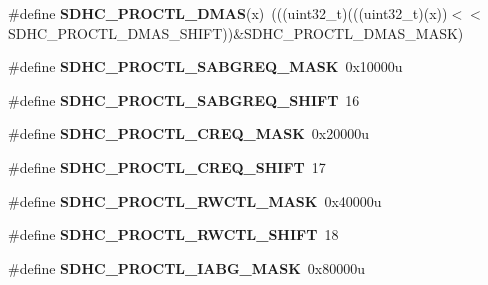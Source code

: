 \begin{DoxyCompactItemize}
\item 
\#define {\bfseries S\+D\+H\+C\+\_\+\+P\+R\+O\+C\+T\+L\+\_\+\+D\+M\+AS}(x)~(((uint32\+\_\+t)(((uint32\+\_\+t)(x))$<$$<$S\+D\+H\+C\+\_\+\+P\+R\+O\+C\+T\+L\+\_\+\+D\+M\+A\+S\+\_\+\+S\+H\+I\+FT))\&S\+D\+H\+C\+\_\+\+P\+R\+O\+C\+T\+L\+\_\+\+D\+M\+A\+S\+\_\+\+M\+A\+SK)\hypertarget{group__SDHC__Register__Masks_gab38de53d7a54fdbd16e4a485b83282af}{}\label{group__SDHC__Register__Masks_gab38de53d7a54fdbd16e4a485b83282af}

\item 
\#define {\bfseries S\+D\+H\+C\+\_\+\+P\+R\+O\+C\+T\+L\+\_\+\+S\+A\+B\+G\+R\+E\+Q\+\_\+\+M\+A\+SK}~0x10000u\hypertarget{group__SDHC__Register__Masks_gab4bb75efee8a2303ff47f441630f7d3f}{}\label{group__SDHC__Register__Masks_gab4bb75efee8a2303ff47f441630f7d3f}

\item 
\#define {\bfseries S\+D\+H\+C\+\_\+\+P\+R\+O\+C\+T\+L\+\_\+\+S\+A\+B\+G\+R\+E\+Q\+\_\+\+S\+H\+I\+FT}~16\hypertarget{group__SDHC__Register__Masks_ga124dcc1ca07a3d3e8600609fa80d9496}{}\label{group__SDHC__Register__Masks_ga124dcc1ca07a3d3e8600609fa80d9496}

\item 
\#define {\bfseries S\+D\+H\+C\+\_\+\+P\+R\+O\+C\+T\+L\+\_\+\+C\+R\+E\+Q\+\_\+\+M\+A\+SK}~0x20000u\hypertarget{group__SDHC__Register__Masks_ga6278901eea66f3db196739c4dc820644}{}\label{group__SDHC__Register__Masks_ga6278901eea66f3db196739c4dc820644}

\item 
\#define {\bfseries S\+D\+H\+C\+\_\+\+P\+R\+O\+C\+T\+L\+\_\+\+C\+R\+E\+Q\+\_\+\+S\+H\+I\+FT}~17\hypertarget{group__SDHC__Register__Masks_ga8b783b0ab48e4f66cafa6fc7da38cfbb}{}\label{group__SDHC__Register__Masks_ga8b783b0ab48e4f66cafa6fc7da38cfbb}

\item 
\#define {\bfseries S\+D\+H\+C\+\_\+\+P\+R\+O\+C\+T\+L\+\_\+\+R\+W\+C\+T\+L\+\_\+\+M\+A\+SK}~0x40000u\hypertarget{group__SDHC__Register__Masks_gadefa120c89ff122b91a0fda6b551930a}{}\label{group__SDHC__Register__Masks_gadefa120c89ff122b91a0fda6b551930a}

\item 
\#define {\bfseries S\+D\+H\+C\+\_\+\+P\+R\+O\+C\+T\+L\+\_\+\+R\+W\+C\+T\+L\+\_\+\+S\+H\+I\+FT}~18\hypertarget{group__SDHC__Register__Masks_ga3ba901ecf6267198e180a9299b4c430c}{}\label{group__SDHC__Register__Masks_ga3ba901ecf6267198e180a9299b4c430c}

\item 
\#define {\bfseries S\+D\+H\+C\+\_\+\+P\+R\+O\+C\+T\+L\+\_\+\+I\+A\+B\+G\+\_\+\+M\+A\+SK}~0x80000u\hypertarget{group__SDHC__Register__Masks_ga837bace762b865593415b31c06dbf5c4}{}\label{group__SDHC__Register__Masks_ga837bace762b865593415b31c06dbf5c4}


\end{DoxyCompactItemize}

